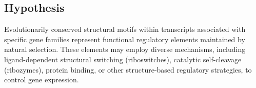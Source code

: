 \documentclass{article}
\begin{document}
\subsection{Hypothesis}
Evolutionarily conserved structural motifs within transcripts associated with specific gene families represent functional regulatory elements maintained by natural selection.
These elements may employ diverse mechanisms, including ligand-dependent structural switching (riboswitches), catalytic self-cleavage (ribozymes), protein binding, or other structure-based regulatory strategies, to control gene expression.

\newpage
\printbibliography
\end{document}
